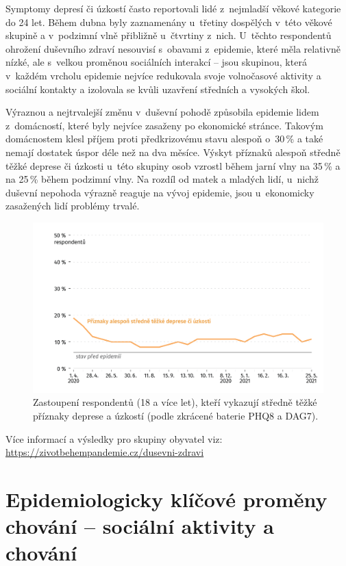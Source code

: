 Symptomy depresí či úzkostí často reportovali lidé z~nejmladší věkové kategorie do 24 let. Během dubna byly zaznamenány u~třetiny dospělých v této věkové skupině a v podzimní vlně přibližně u~čtvrtiny z~nich. U~těchto respondentů ohrožení duševního zdraví nesouvisí s obavami z epidemie, které měla relativně nízké, ale s velkou proměnou sociálních interakcí – jsou skupinou, která v každém vrcholu epidemie nejvíce redukovala svoje volnočasové aktivity a sociální kontakty a izolovala se kvůli uzavření středních a vysokých škol.

Výraznou a nejtrvalejší změnu v~duševní pohodě způsobila epidemie lidem z do\-mác\-nos\-tí, které byly nejvíce zasaženy po ekonomické stránce. Takovým domácnostem klesl příjem proti předkrizovému stavu alespoň o~30\,\% a také nemají dostatek úspor déle než na dva měsíce. Výskyt příznaků alespoň středně těžké deprese či úzkosti u~této skupiny osob vzrostl během jarní vlny na 35\,\% a na 25\,\% během podzimní vlny. Na rozdíl od matek a mladých lidí, u~nichž duševní nepohoda výrazně reaguje na vývoj epidemie, jsou u~ekonomicky zasažených lidí problémy trvalé.


\begin{figure}[ht]
    \centering
    \includegraphics[width=\textwidth]{./pic/zbp-graf2.png}
    \caption{Zastoupení respondentů (18 a více let), kteří vykazují středně těžké příznaky deprese a úzkostí (podle zkrácené baterie PHQ8 a DAG7).}
    \label{fig:zbp2}
\end{figure}

Více informací a výsledky pro skupiny obyvatel viz: \url{https://zivotbehempandemie.cz/dusevni-zdravi}


\section*{Epidemiologicky klíčové proměny chování – sociální aktivity a chování}
\label{Epidemi_promeny}

